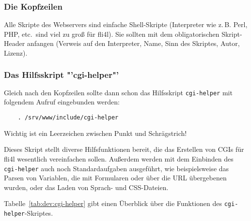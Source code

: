 \subsubsection{Die Kopfzeilen}
Alle Skripte des Webservers sind einfache Shell-Skripte (Interpreter wie z.\,B.
Perl, PHP, etc.\ sind viel zu groß für fli4l). Sie sollten mit dem
obligatorischen Skript-Header anfangen (Verweis auf den Interpreter,
Name, Sinn des Skriptes, Autor, Lizenz).

\subsubsection{Das Hilfsskript "'cgi-helper"'}
Gleich nach den Kopfzeilen sollte dann schon das Hilfsskript \texttt{cgi-helper}
mit folgendem Aufruf eingebunden werden:

\begin{example}
\begin{verbatim}
    . /srv/www/include/cgi-helper
\end{verbatim}
\end{example}

Wichtig ist ein Leerzeichen zwischen Punkt und Schrägstrich!

Dieses Skript stellt diverse Hilfsfunktionen bereit, die das Erstellen von CGIs
für fli4l wesentlich vereinfachen sollen. Außerdem werden mit dem Einbinden
des \texttt{cgi-helper} auch noch Standardaufgaben ausgeführt, wie
beispielsweise das Parsen von Variablen, die mit Formularen oder über die URL
übergebenen wurden, oder das Laden von Sprach- und CSS-Dateien.

Tabelle~\ref{tab:dev:cgi-helper} gibt einen Überblick über die Funktionen des
\texttt{cgi-helper}-Skriptes.

